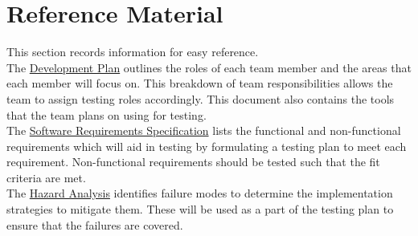 \documentclass[12pt, titlepage]{article}
\begin{document}
\newpage

\section{Reference Material}

This section records information for easy reference. \\


\noindent The \href{https://github.com/stanreee/sign-language-learning/blob/main/docs/DevelopmentPlan/DevelopmentPlan.pdf}{Development Plan} outlines the roles of each team member and the areas that each member will focus on. This breakdown of team responsibilities allows the team to assign testing roles accordingly. This document also contains the tools that the team plans on using for testing.\\


\noindent The \href{https://github.com/stanreee/sign-language-learning/blob/main/docs/SRS/SRS.pdf}{Software Requirements Specification} lists the functional and non-functional requirements which will aid in testing by formulating a testing plan to meet each requirement. Non-functional requirements should be tested such that the fit criteria are met.\\


\noindent The \href{https://github.com/stanreee/sign-language-learning/blob/main/docs/HazardAnalysis/HazardAnalysis.pdf}{Hazard Analysis} identifies failure modes to determine the implementation strategies to mitigate them. These will be used as a part of the testing plan to ensure that the failures are covered.\\

\end{document}
